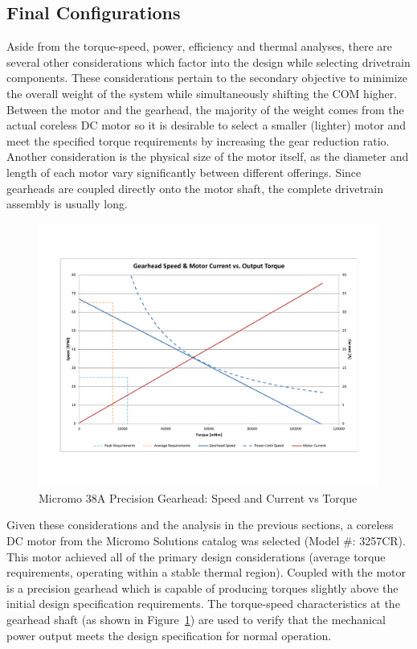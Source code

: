 \subsection{Final Configurations} %
\label{sub:final_configurations}
Aside from the torque-speed, power, efficiency and thermal analyses, there are several other considerations which factor into the design  while selecting drivetrain components. These considerations pertain to the secondary objective to minimize the overall weight of the system while simultaneously shifting the COM higher. Between the motor and the gearhead, the majority of the weight comes from the actual coreless DC motor so it is desirable to select a smaller (lighter) motor and meet the specified torque requirements by increasing the gear reduction ratio. Another consideration is the physical size of the motor itself, as the diameter and length of each motor vary significantly between different offerings. Since gearheads are coupled directly onto the motor shaft, the complete drivetrain assembly is usually long. 

\begin{figure}[!h]
	\begin{center}
    \includegraphics[trim = 20mm 30mm 20mm 30mm,clip,width=15cm]{fig/design/gearhead1.pdf}
	\end{center}
  \caption{Micromo 38A Precision Gearhead: Speed and Current vs Torque}
  \label{fig:micromo38a}
\end{figure}

Given these considerations and the analysis in the previous sections, a coreless DC motor from the Micromo Solutions catalog was selected  (Model \#: 3257CR). This motor achieved all of the primary design considerations (average torque requirements, operating within a stable thermal region). Coupled with the motor is a precision gearhead which is capable of producing torques slightly above the initial design specification requirements. The torque-speed characteristics at the gearhead shaft (as shown in Figure~\ref{fig:micromo38a}) are used to verify that the mechanical power output meets the design specification for normal operation. 

